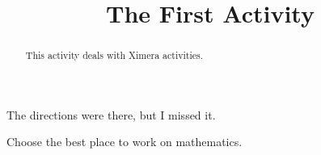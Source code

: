 \documentclass{ximera}
\title{The First Activity}
\begin{document}
  
	\begin{abstract}  
		This activity deals with Ximera activities.  
	\end{abstract}  
	\maketitle  
	The directions were there, but I missed it.  
	\begin{exercise}  
		Choose the best place to work on mathematics.  
		\begin{multipleChoice}  
		\end{multipleChoice}  
	\end{exercise}  
\end{document}
